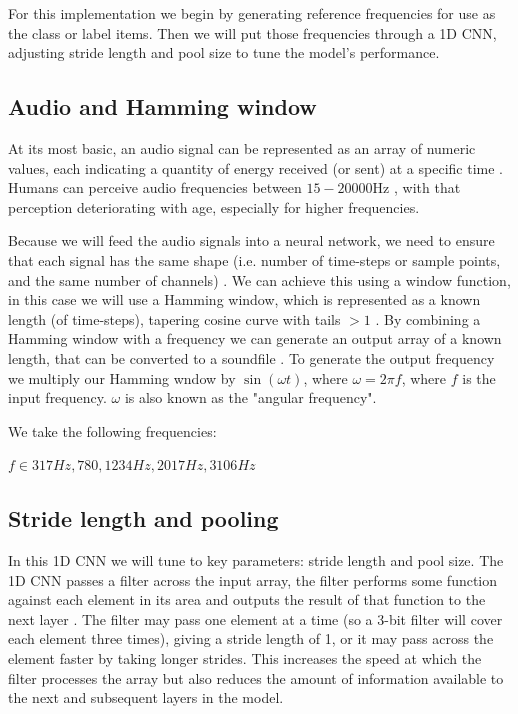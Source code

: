 \documentclass{article}
\begin{document}
For this implementation we begin by generating reference frequencies for use as the class or label items. Then we will put those frequencies through a 1D CNN, adjusting stride length and pool size to tune the model's performance.

\subsection{Audio and Hamming window}
\label{ssec:audio}
At its most basic, an audio signal can be represented as an array of numeric values, each indicating a quantity of energy received (or sent) at a specific time \cite{noauthor_audio_nodate}.  Humans can perceive audio frequencies between $15 - 20000$Hz \cite{Kulkarni_human}, with that perception deteriorating with age, especially for higher frequencies.  

Because we will feed the audio signals into a neural network, we need to ensure that each signal has the same shape (i.e. number of time-steps or sample points, and the same number of channels) \cite{noauthor_audio_nodate}.  We can achieve this using a window function, in this case we will use a Hamming window, which is represented as a known length (of time-steps), tapering cosine curve with tails $>1$ \cite{noauthor_use_nodate} \cite{harris_multirate_1987}.  By combining a Hamming window with a frequency we can generate an output array of a known length, that can be converted to a soundfile  \cite{noauthor_05-frequency-analysis_nodate}.  To generate the output frequency we multiply our Hamming wndow by $\sin ( \omega t)$, where $ \omega = 2 \pi f $, where $ f $ is the input frequency.  $ \omega$ is also known as the "angular frequency".  

We take the following frequencies:

$f \in {317Hz, 780, 1234Hz, 2017Hz, 3106Hz}$  

\subsection{Stride length and pooling}
\label{ssec:stride}

In this 1D CNN we will tune to key parameters:  stride length and pool size.  The 1D CNN passes a filter across the input array, the filter performs some function against each element in its area and outputs the result of that function to the next layer \cite{noauthor_convolutional_nodate}.  The filter may pass one element at a time (so a 3-bit filter will cover each element three times), giving a stride length of 1, or it may pass across the element faster by taking longer strides.  This increases the speed at which the filter processes the array but also reduces the amount of information available to the next and subsequent layers in the model.  
\end{document}
